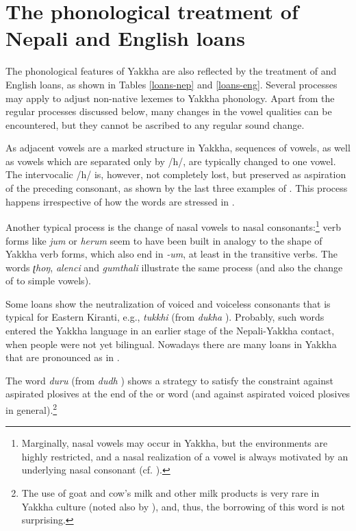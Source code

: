 \section{The phonological treatment of Nepali and English loans}\label{loansphon}

The phonological features of Yakkha are also reflected by the treatment of  and English loans, as shown in Tables \ref{loans-nep} and \ref{loans-eng}. Several processes may apply to adjust non-native lexemes to Yakkha phonology. Apart from the regular processes discussed below, many changes in the vowel qualities can be encountered, but they cannot be ascribed to any regular sound change.

As adjacent vowels are a marked structure in Yakkha, sequences of vowels, as well as  vowels which are separated only by /h/, are typically changed to one vowel. The intervocalic /h/ is, however, not completely lost, but preserved as aspiration of the preceding consonant, as shown by the last three examples of . This process  happens irrespective of how the words are stressed in .

Another typical process is the change of nasal vowels to nasal consonants:\footnote{Marginally, nasal vowels may occur in Yakkha, but the environments are highly restricted, and a nasal realization of a vowel is always motivated by an underlying nasal consonant (cf. ).}   verb forms like  \emph{jum}  or \emph{herum}  seem to have been built in analogy to the shape of Yakkha  verb forms, which also end in \emph{-um}, at least in the transitive verbs. The words  \emph{ʈhoŋ}, \emph{alenci} and \emph{gumthali} illustrate the same process (and also the change of  to simple vowels). 
 
Some loans show the neutralization of voiced and voiceless consonants that is typical for Eastern Kiranti, e.g., \emph{tukkhi} (from  \emph{dukha} ). Probably, such  words entered the Yakkha language in an earlier stage of the Nepali-Yakkha contact, when people were not yet bilingual. Nowadays there are many  loans in Yakkha that are pronounced as in . 
 
 The word \emph{duru} (from  \emph{dudh} ) shows a strategy to satisfy the constraint against aspirated plosives at the end of the  or word (and against aspirated voiced plosives in general).\footnote{The use of goat and cow's milk and other milk products is very rare in Yakkha culture (noted also by \citealt[128--30]{Russell1992_Yakha}), and, thus, the borrowing of this word is not surprising.} 
 

